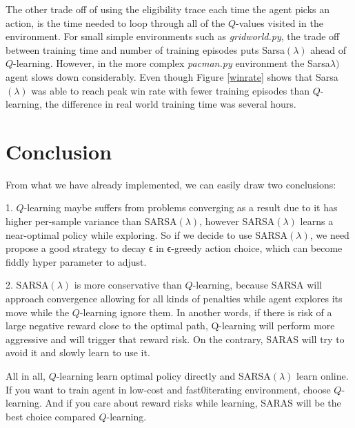 \documentclass[10pt,conference]{IEEEtran}
\begin{document}
	The other trade off of using the eligibility trace each time the agent 
	picks an action, is the time needed to loop through all of the \(Q\)-values
	visited in the environment. For small simple environments such as \textit{gridworld.py},
	the trade off between training time and number of training episodes puts 
	Sarsa\((\lambda)\) ahead of \(Q\)-learning. However, in the more complex 
	\textit{pacman.py} environment the Sarsa\(\lambda)\) agent slows down 
	considerably. Even though Figure \ref{winrate} shows that Sarsa\((\lambda)\) 
	was able to reach peak win rate with fewer training episodes than \(Q\)-learning,
	the difference in real world training time was several hours.

\section{Conclusion}
From what we have already implemented, we can easily draw two conclusions:

1. \(Q\)-learning maybe suffers from problems converging as a result due to it has higher per-sample variance than SARSA\((\lambda)\), however SARSA\((\lambda)\) learns a near-optimal policy while exploring. So if we decide to use SARSA\((\lambda)\), we need propose a good strategy to decay ϵ in  ϵ-greedy action choice, which can become fiddly hyper parameter to adjust.

2. SARSA\((\lambda)\) is more conservative than \(Q\)-learning, because SARSA will approach convergence allowing for all kinds of penalties while agent explores its move while the \(Q\)-learning ignore them. In another words, if there is risk of a large negative reward close to the optimal path, Q-learning will perform more aggressive and will trigger that reward risk. On the contrary, SARAS will try to avoid it and slowly learn to use it.

All in all, \(Q\)-learning learn optimal policy directly and SARSA\((\lambda)\) learn online. If you want to train agent in low-cost and fast0iterating environment, choose \(Q\)-learning. And if you care about reward risks while learning, SARAS will be the best choice compared \(Q\)-learning.

\label{sec:conclusion}



\end{document}
